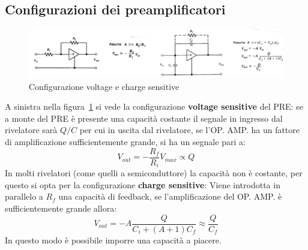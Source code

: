 \subsection{Configurazioni dei preamplificatori}
\begin{figure}[htbp]
\begin{center}
\includegraphics[scale=0.6]{./Immagini/ConfigurazioniPRE.png}
\caption{Configurazione voltage e charge sensitive}
\label{fig:configurazioniPRE}
\end{center}
\end{figure}
A sinistra nella figura~\ref{fig:configurazioniPRE} si vede la configurazione \textbf{voltage sensitive} del PRE:
se a monte del PRE \`e presente una capacit\`a costante il segnale in ingresso dal rivelatore sar\`a $Q/C$ per cui in uscita dal rivelatore,
se l'OP. AMP. ha un fattore di amplificazione sufficientemente grande, si ha un segnale pari a:
\begin{equation*}
V_{out} = - \frac{R_f}{R_i} V_{max} \propto Q
\end{equation*}
In molti rivelatori (come quelli a semiconduttore) la capacit\`a non \`e costante, per questo si opta per la configurazione \textbf{charge sensitive}:
Viene introdotta in parallelo a $R_f$ una capacit\`a di feedback, se l'amplificazione del OP. AMP. \`e sufficientemente grande allora:
\begin{equation*}
V_{out} = -A \frac{Q}{C_i + (A+1) C_f} \approx \frac{Q}{C_f}
\end{equation*}
In questo modo \`e possibile imporre una capacit\`a a piacere.
